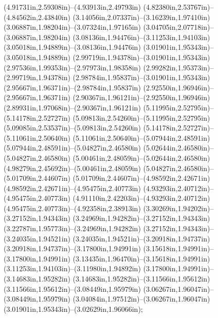 (4.91731in,2.59308in)--(4.93913in,2.49793in) (4.82380in,2.53767in)--(4.84562in,2.43840in) (3.14056in,2.07337in)--(3.16239in,1.97410in) (3.06887in,1.98204in)--(3.07324in,1.97165in) (3.04705in,2.07718in)--(3.06887in,1.98204in) (3.08136in,1.94476in)--(3.11253in,1.94103in) (3.05018in,1.94889in)--(3.08136in,1.94476in) (3.01901in,1.95343in)--(3.05018in,1.94889in) (2.99719in,1.94378in)--(3.01901in,1.95343in) (2.97536in,1.99353in)--(2.97973in,1.98358in) (2.99282in,1.95373in)--(2.99719in,1.94378in) (2.98784in,1.95837in)--(3.01901in,1.95343in) (2.95667in,1.96371in)--(2.98784in,1.95837in) (2.92550in,1.96946in)--(2.95667in,1.96371in) (2.90367in,1.96121in)--(2.92550in,1.96946in) (2.89931in,1.97068in)--(2.90367in,1.96121in) (5.11995in,2.52795in)--(5.14178in,2.52727in) (5.09813in,2.54260in)--(5.11995in,2.52795in) (5.09085in,2.53537in)--(5.09813in,2.54260in) (5.14178in,2.52727in)--(5.11061in,2.50640in) (5.11061in,2.50640in)--(5.07944in,2.48591in) (5.07944in,2.48591in)--(5.04827in,2.46580in) (5.02644in,2.46580in)--(5.04827in,2.46580in) (5.00461in,2.48059in)--(5.02644in,2.46580in) (4.98279in,2.45692in)--(5.00461in,2.48059in) (5.04827in,2.46580in)--(5.01709in,2.44607in) (5.01709in,2.44607in)--(4.98592in,2.42671in) (4.98592in,2.42671in)--(4.95475in,2.40773in) (4.93293in,2.40712in)--(4.95475in,2.40773in) (4.91110in,2.42203in)--(4.93293in,2.40712in) (4.95475in,2.40773in)--(4.92358in,2.38913in) (3.30269in,1.94202in)--(3.27152in,1.94343in) (3.24969in,1.94282in)--(3.27152in,1.94343in) (3.22787in,1.95773in)--(3.24969in,1.94282in) (3.27152in,1.94343in)--(3.24035in,1.94521in) (3.24035in,1.94521in)--(3.20918in,1.94737in) (3.20918in,1.94737in)--(3.17800in,1.94991in) (3.15618in,1.94991in)--(3.17800in,1.94991in) (3.13435in,1.96470in)--(3.15618in,1.94991in) (3.11253in,1.94103in)--(3.11980in,1.94892in) (3.17800in,1.94991in)--(3.14683in,1.95282in) (3.14683in,1.95282in)--(3.11566in,1.95612in) (3.11566in,1.95612in)--(3.08449in,1.95979in) (3.06267in,1.96047in)--(3.08449in,1.95979in) (3.04084in,1.97512in)--(3.06267in,1.96047in) (3.01901in,1.95343in)--(3.02629in,1.96066in);
